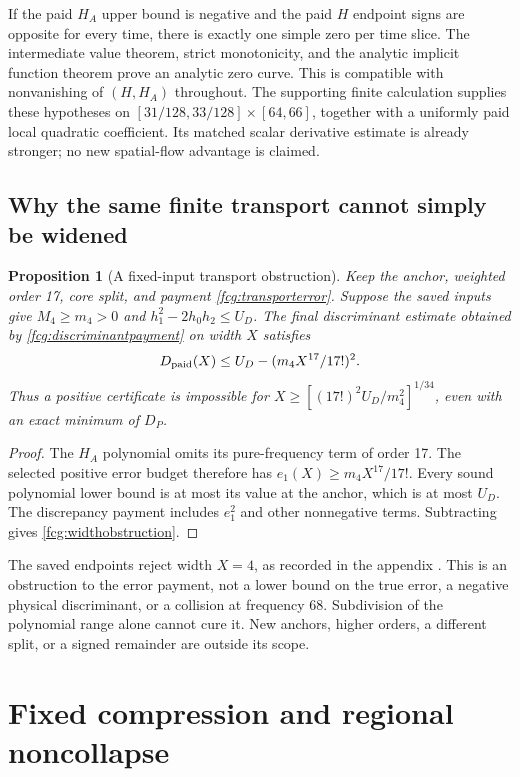 \documentclass[11pt]{article}
\numberwithin{equation}{section}
\newtheorem{proposition}[theorem]{Proposition}
\begin{document}
If the paid $H_A$ upper bound is negative and the paid $H$ endpoint
signs are opposite for every time, there is exactly one simple zero
per time slice. The intermediate value theorem, strict monotonicity,
and the analytic implicit function theorem prove an analytic zero
curve. This is compatible with nonvanishing of $(H,H_A)$ throughout.
The supporting finite calculation supplies these hypotheses on
$[31/128,33/128]\times[64,66]$, together with a uniformly paid local
quadratic coefficient. Its matched scalar derivative estimate is
already stronger; no new spatial-flow advantage is claimed.

\subsection{Why the same finite transport cannot simply be widened}

\begin{proposition}[A fixed-input transport obstruction]
\label{fcg:transportlimit}
Keep the anchor, weighted order 17, core split, and payment
\eqref{fcg:transporterror}. Suppose the saved inputs give $M_4\ge m_4>0$
and $h_1^2-2h_0h_2\le U_D$. The final discriminant estimate obtained
by \eqref{fcg:discriminantpayment} on width $X$ satisfies
\begin{equation}\label{fcg:widthobstruction}
 D_{\rm paid}(X)\le U_D-(m_4X^{17}/17!)^2.
\end{equation}
Thus a positive certificate is impossible for
$X\ge[(17!)^2U_D/m_4^2]^{1/34}$, even with an exact minimum of $D_P$.
\end{proposition}
\begin{proof}
The $H_A$ polynomial omits its pure-frequency term of order 17.
The selected positive error budget therefore has
$e_1(X)\ge m_4X^{17}/17!$. Every sound polynomial lower bound is
at most its value at the anchor, which is at most $U_D$.
The discrepancy payment includes $e_1^2$ and other nonnegative
terms. Subtracting gives \eqref{fcg:widthobstruction}.
\end{proof}

The saved endpoints reject width $X=4$, as recorded in the appendix
\cite{FCGCommonFlowLimit}. This is an obstruction to the error
payment, not a lower bound on the true error, a negative physical
discriminant, or a collision at frequency 68. Subdivision of the
polynomial range alone cannot cure it. New anchors, higher orders,
a different split, or a signed remainder are outside its scope.

\section{Fixed compression and regional noncollapse}
\label{fcg:fixedflow}
\end{document}

